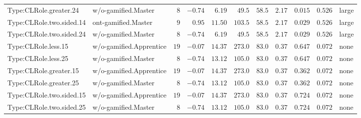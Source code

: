\documentclass[6pt,a4paper]{article}
\begin{document}
{\begin{longtable}{llrrrrrrrrl}
Type:CLRole.greater.24&w/o-gamified.Master&$ 8$&$-0.74$&$ 6.19$&$ 49.5$&$ 58.5$&$ 2.17$&$0.015$&$0.526$&large\tabularnewline
Type:CLRole.two.sided.14&ont-gamified.Master&$ 9$&$ 0.95$&$11.50$&$103.5$&$ 58.5$&$ 2.17$&$0.029$&$0.526$&large\tabularnewline
Type:CLRole.two.sided.24&w/o-gamified.Master&$ 8$&$-0.74$&$ 6.19$&$ 49.5$&$ 58.5$&$ 2.17$&$0.029$&$0.526$&large\tabularnewline
Type:CLRole.less.15&w/o-gamified.Apprentice&$19$&$-0.07$&$14.37$&$273.0$&$ 83.0$&$ 0.37$&$0.647$&$0.072$&none\tabularnewline
Type:CLRole.less.25&w/o-gamified.Master&$ 8$&$-0.74$&$13.12$&$105.0$&$ 83.0$&$ 0.37$&$0.647$&$0.072$&none\tabularnewline
Type:CLRole.greater.15&w/o-gamified.Apprentice&$19$&$-0.07$&$14.37$&$273.0$&$ 83.0$&$ 0.37$&$0.362$&$0.072$&none\tabularnewline
Type:CLRole.greater.25&w/o-gamified.Master&$ 8$&$-0.74$&$13.12$&$105.0$&$ 83.0$&$ 0.37$&$0.362$&$0.072$&none\tabularnewline
\newpage
Type:CLRole.two.sided.15&w/o-gamified.Apprentice&$19$&$-0.07$&$14.37$&$273.0$&$ 83.0$&$ 0.37$&$0.724$&$0.072$&none\tabularnewline
Type:CLRole.two.sided.25&w/o-gamified.Master&$ 8$&$-0.74$&$13.12$&$105.0$&$ 83.0$&$ 0.37$&$0.724$&$0.072$&none\tabularnewline
\hline
\end{longtable}}
\end{document}
